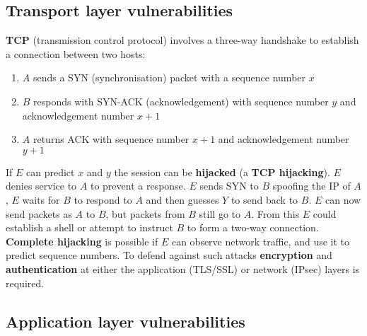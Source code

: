 \documentclass[final]{article}
\begin{document}
\subsection{Transport layer vulnerabilities}
\textbf{TCP} (transmission control protocol) involves a three-way handshake to establish a connection between two hosts:
\begin{enumerate}
	\item $ A $ sends a SYN (synchronisation) packet with a sequence number $ x $
	\item $ B $ responds with SYN-ACK (acknowledgement) with sequence number $ y $ and acknowledgement number $ x + 1 $
	\item $ A $ returns ACK with sequence number $ x + 1 $ and acknowledgement number $ y + 1 $
\end{enumerate}
If $ E $ can predict $ x $ and $ y $ the session can be \textbf{hijacked} (a \textbf{TCP hijacking}). $ E $ denies service to $ A $ to prevent a  response. $ E $ sends SYN to $ B $ spoofing the IP of $ A $, $ E $ waits for $ B $ to respond to $ A $ and then guesses $ Y $ to send back to $ B $. $ E $ can now send packets as $ A $ to $ B $, but packets from $ B $ still go to $ A $. From this $ E $ could establish a shell or attempt to instruct $ B $ to form a two-way connection. \textbf{Complete hijacking} is possible if $ E $ can observe network traffic, and use it to predict sequence numbers. To defend against such attacks \textbf{encryption} and \textbf{authentication} at either the application (TLS/SSL) or network (IPsec) layers is required.

\subsection{Application layer vulnerabilities}
\end{document}
